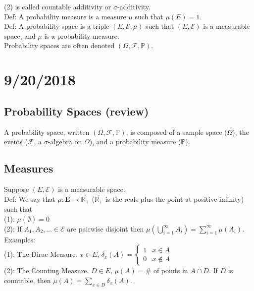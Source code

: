 \documentclass[english, 11pt]{article}
\begin{document}
(2) is called countable additivity or $\sigma$-additivity.\\

Def: A probability measure is a measure $\mu$ such that $\mu(E) = 1$.\\

Def: A probability space is a triple $(E, \mathcal{E}, \mu)$ such that $(E, \mathcal{E})$ is a measurable space, and $\mu$ is a probability measure.\\

Probability spaces are often denoted $(\Omega, \mathcal{F}, \mathbb{P})$.

\section{9/20/2018}

\subsection{Probability Spaces (review)}

A probability space, written $(\Omega, \mathcal{F}, \mathbb{P})$, is composed of a sample space ($\Omega$), the events ($\mathcal{F}$, a $\sigma$-algebra on $\Omega$), and a probability measure ($\mathbb{P}$).

\subsection{Measures}

Suppose $(E, \mathcal{E})$ is a measurable space.\\

Def: We say that $\mu: \mathbf{E} \to \overline{\mathbb{R}_+}$ ($\overline{\mathbb{R}_+}$ is the reals plus the point at positive infinity) such that\\

(1): $\mu(\emptyset) = 0$\\
(2): If $A_1, A_2, \dots \in \mathcal{E}$ are pairwise disjoint then $\mu(\bigcup^\infty_{i = 1} A_i) = \sum^\infty_{i=1} \mu(A_i)$.\\

 
Examples:\\
(1): The Dirac Measure. $x \in E$, $\delta_x(A) =
\begin{cases}
1 & x \in A\\
0 & x \not \in A
\end{cases}$\\

(2): The Counting Measure. $D \in E$, $\mu(A) = $\# of points in $A \cap D$. If $D$ is countable, then $\mu(A) = \sum_{x \in D} \delta_x(A)$.\\
\end{document}

